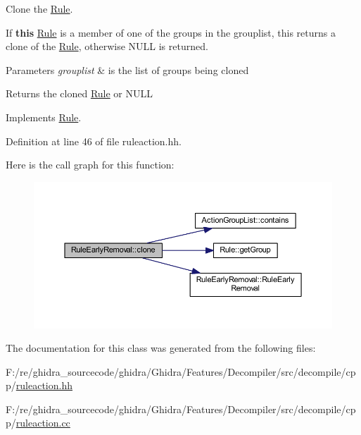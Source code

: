 Clone the \mbox{\hyperlink{class_rule}{Rule}}. 

If {\bfseries{this}} \mbox{\hyperlink{class_rule}{Rule}} is a member of one of the groups in the grouplist, this returns a clone of the \mbox{\hyperlink{class_rule}{Rule}}, otherwise N\+U\+LL is returned. 
\begin{DoxyParams}{Parameters}
{\em grouplist} & is the list of groups being cloned \\
\hline
\end{DoxyParams}
\begin{DoxyReturn}{Returns}
the cloned \mbox{\hyperlink{class_rule}{Rule}} or N\+U\+LL 
\end{DoxyReturn}


Implements \mbox{\hyperlink{class_rule_a70de90a76461bfa7ea0b575ce3c11e4d}{Rule}}.



Definition at line 46 of file ruleaction.\+hh.

Here is the call graph for this function\+:
\nopagebreak
\begin{figure}[H]
\begin{center}
\leavevmode
\includegraphics[width=350pt]{class_rule_early_removal_a51a80e5b1a90383f7ab38dd5da1b19c0_cgraph}
\end{center}
\end{figure}


The documentation for this class was generated from the following files\+:\begin{DoxyCompactItemize}
\item 
F\+:/re/ghidra\+\_\+sourcecode/ghidra/\+Ghidra/\+Features/\+Decompiler/src/decompile/cpp/\mbox{\hyperlink{ruleaction_8hh}{ruleaction.\+hh}}\item 
F\+:/re/ghidra\+\_\+sourcecode/ghidra/\+Ghidra/\+Features/\+Decompiler/src/decompile/cpp/\mbox{\hyperlink{ruleaction_8cc}{ruleaction.\+cc}}\end{DoxyCompactItemize}

